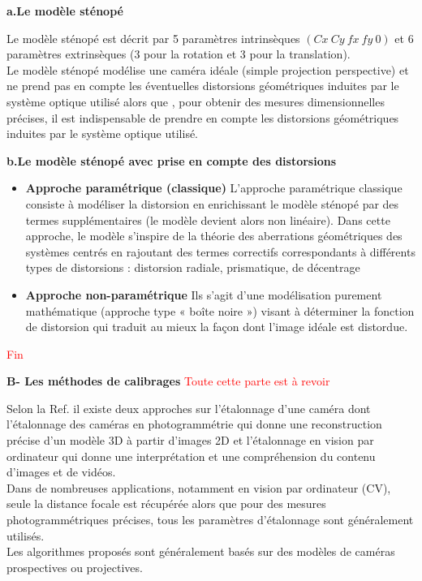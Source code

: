 \documentclass[12pt,a4paper]{report}
\begin{document}
\begin{center}
 \textbf{a.Le modèle sténopé } 	
\end{center}

	 
 Le modèle sténopé est décrit par 5 paramètres intrinsèques  $ (Cx \ Cy \ fx \ fy \ 0) $ et 6 paramètres extrinsèques (3 pour la rotation et 3 pour la translation). \\
Le modèle sténopé modélise une caméra idéale (simple projection perspective) et ne prend pas en compte les éventuelles distorsions géométriques induites par le système optique utilisé alors que , pour obtenir des mesures dimensionnelles précises, il est indispensable de prendre en compte les distorsions géométriques induites par le système optique utilisé.\\

\begin{center}
	\textbf{b.Le modèle sténopé avec prise en compte des distorsions} 	
\end{center}

\begin{itemize}
	\item \textbf{Approche paramétrique (classique)} 
L'approche paramétrique classique consiste à modéliser la distorsion en enrichissant le modèle sténopé par
des termes supplémentaires (le modèle devient alors non linéaire). Dans cette approche, le modèle s'inspire de
la théorie des aberrations géométriques des systèmes centrés en rajoutant des termes correctifs
correspondants à différents types de distorsions : distorsion radiale, prismatique, de décentrage\\

\item \textbf{Approche non-paramétrique}
Ils s'agit d'une modélisation purement mathématique (approche type « boîte noire ») visant à
déterminer la fonction de distorsion qui traduit au mieux la façon dont l'image idéale est distordue.\\
\end{itemize}
 \textcolor{red}{Fin}\\

\begin{center}
	\textbf{B- Les méthodes de calibrages} \textcolor{red}{Toute cette parte est à revoir}
\end{center}


Selon la Ref.\cite{remondino_digital_2006} il existe deux approches sur l'étalonnage d'une caméra dont 
l'étalonnage des caméras en photogrammétrie qui donne une reconstruction précise d'un modèle 3D à partir d'images 2D et l'étalonnage en vision par ordinateur qui donne une interprétation et une compréhension du contenu d'images et de vidéos. \\
Dans de nombreuses applications, notamment en vision par ordinateur (CV), seule la distance focale est récupérée alors que pour des mesures photogrammétriques précises, tous les paramètres d'étalonnage sont généralement utilisés.\\
Les algorithmes proposés sont généralement basés sur des modèles de caméras prospectives ou projectives.
\end{document}
